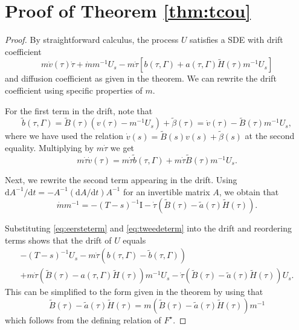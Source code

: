 \documentclass[preprint]{imsart}
\renewcommand{\tilde}{\widetilde}
\providecommand{\I}{\mathrm{I}}
\theoremstyle{definition}
\begin{document}
\section{Proof of Theorem \ref{thm:tcou}}\label{app:proofs}

\begin{proof}
By straightforward calculus, the process $U$ satisfies a SDE with drift coefficient 
\[
m \dot{v}(\tau) \dot\tau + \dot{m}m^{-1} U_s -m \dot\tau \left[b(\tau,\Gamma)+a(\tau,\Gamma) \tilde{H}(\tau) m^{-1} U_s\right]
\]
and diffusion coefficient as given in the theorem. We can rewrite the drift coefficient using specific properties of $m$. 

For the first term in the drift, note that
\[
\tilde{b}(\tau, \Gamma)  = \tilde{B}(\tau) \left(v(\tau)-m^{-1} U_s\right) + \tilde\beta(\tau)  = \dot{v}(\tau) - \tilde{B}(\tau) m^{-1} U_s,
\]
where we have used  the relation $\dot{v}(s)=\tilde{B}(s) v(s) + \tilde\beta(s)$ at the second equality.  Multiplying by $m\dot\tau$ we get
\begin{equation}\label{eq:eersteterm}  m \dot\tau \dot{v}(\tau) = m \dot\tau 	\tilde{b}(\tau, \Gamma)  +m\dot\tau \tilde{B}(\tau) m^{-1} U_s. \end{equation}

Next, we rewrite the second term appearing in the drift. Using $\mathrm{d} {A}^{-1}/\mathrm{d}t = - {A}^{-1}\left( \mathrm{d}{A}/\mathrm{d}t\right) {A}^{-1}$  for an invertible matrix $A$, we obtain that
\begin{equation}\label{eq:tweedeterm} \dot{m} m^{-1} =-(T-s)^{-1} \I -\dot\tau \left(\tilde{B}(\tau)-\tilde{a}(\tau) \tilde{H}(\tau)\right). \end{equation}

Substituting \eqref{eq:eersteterm} and \eqref{eq:tweedeterm} into the drift and reordering terms shows that the drift of $U$ equals
\begin{multline*} -(T-s)^{-1} U_s - m\dot\tau \left(b(\tau,\Gamma)-\tilde{b}(\tau,\Gamma)\right)\\ +m\dot\tau \left(\tilde{B}(\tau)-a(\tau,\Gamma) \tilde{H}(\tau)\right) m^{-1}U_s - \dot\tau \left(\tilde{B}(\tau)-\tilde{a}(\tau)\tilde{H}(\tau)\right) U_s. \end{multline*}
This can be simplified to the form given in the theorem by using that
\[  \tilde{B}(\tau)-\tilde{a}(\tau) \tilde{H}(\tau)= m\left(\tilde{B}(\tau)-\tilde{a}(\tau) \tilde{H}(\tau)\right) m^{-1} \]
which follows from the defining relation of $F^\star$. 
\end{proof}















\end{document}
